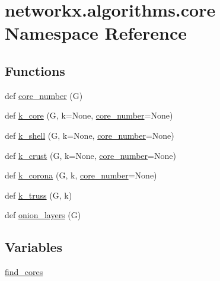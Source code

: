 \hypertarget{namespacenetworkx_1_1algorithms_1_1core}{}\section{networkx.\+algorithms.\+core Namespace Reference}
\label{namespacenetworkx_1_1algorithms_1_1core}
\subsection*{Functions}
\begin{DoxyCompactItemize}
\item 
def \hyperlink{namespacenetworkx_1_1algorithms_1_1core_a2ca45e2c7be2b393d952ca2269ac0012}{core\+\_\+number} (G)
\item 
def \hyperlink{namespacenetworkx_1_1algorithms_1_1core_ab5db12dc45461ec3c6f9565cf96833b8}{k\+\_\+core} (G, k=None, \hyperlink{namespacenetworkx_1_1algorithms_1_1core_a2ca45e2c7be2b393d952ca2269ac0012}{core\+\_\+number}=None)
\item 
def \hyperlink{namespacenetworkx_1_1algorithms_1_1core_ad9d262c33cdaf7f669f8cd323b015b7f}{k\+\_\+shell} (G, k=None, \hyperlink{namespacenetworkx_1_1algorithms_1_1core_a2ca45e2c7be2b393d952ca2269ac0012}{core\+\_\+number}=None)
\item 
def \hyperlink{namespacenetworkx_1_1algorithms_1_1core_a8a22ecae49cb847a57beb7b0b07e3bdd}{k\+\_\+crust} (G, k=None, \hyperlink{namespacenetworkx_1_1algorithms_1_1core_a2ca45e2c7be2b393d952ca2269ac0012}{core\+\_\+number}=None)
\item 
def \hyperlink{namespacenetworkx_1_1algorithms_1_1core_a57daef16204b88cd4c7a0057cff9c2f8}{k\+\_\+corona} (G, k, \hyperlink{namespacenetworkx_1_1algorithms_1_1core_a2ca45e2c7be2b393d952ca2269ac0012}{core\+\_\+number}=None)
\item 
def \hyperlink{namespacenetworkx_1_1algorithms_1_1core_a638bbecff30a1284a4a52aff274d6773}{k\+\_\+truss} (G, k)
\item 
def \hyperlink{namespacenetworkx_1_1algorithms_1_1core_a090000409080af312bbb81a985cce70c}{onion\+\_\+layers} (G)
\end{DoxyCompactItemize}
\subsection*{Variables}
\begin{DoxyCompactItemize}
\item 
\hyperlink{namespacenetworkx_1_1algorithms_1_1core_a32c31accd8d2b5179eaade7e0b34743c}{find\+\_\+cores}
\end{DoxyCompactItemize}


